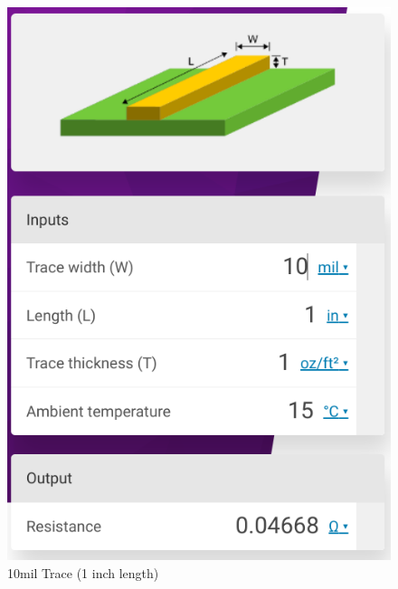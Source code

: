 \documentclass[a4paper,11pt]{article}%
\begin{document}
\begin{figure}[H]
\begin{minipage}[b]{0.45\linewidth}
	\includegraphics[scale=0.4]{figures/10}
	\caption{10mil Trace (1 inch length) }
\end{minipage}
\end{figure}\hspace{1cm}
\end{document}
